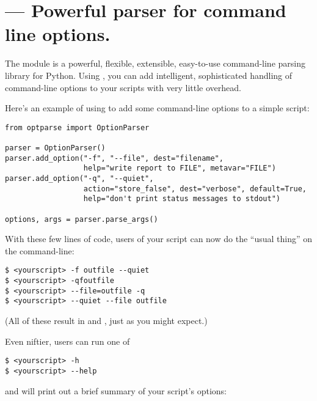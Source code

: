 \section{ ---
        Powerful parser for command line options.}




The  module is a powerful, flexible, extensible,
easy-to-use command-line parsing library for Python.  Using
, you can add intelligent, sophisticated handling of
command-line options to your scripts with very little overhead.

Here's an example of using  to add some command-line
options to a simple script:

\begin{verbatim}
from optparse import OptionParser

parser = OptionParser()
parser.add_option("-f", "--file", dest="filename",
                  help="write report to FILE", metavar="FILE")
parser.add_option("-q", "--quiet",
                  action="store_false", dest="verbose", default=True,
                  help="don't print status messages to stdout")

options, args = parser.parse_args()
\end{verbatim}

With these few lines of code, users of your script can now do the
``usual thing'' on the command-line:

\begin{verbatim}
$ <yourscript> -f outfile --quiet
$ <yourscript> -qfoutfile
$ <yourscript> --file=outfile -q
$ <yourscript> --quiet --file outfile
\end{verbatim}

(All of these result in  and
, just as you might expect.)

Even niftier, users can run one of
\begin{verbatim}
$ <yourscript> -h
$ <yourscript> --help
\end{verbatim}
and  will print out a brief summary of your script's
options:

